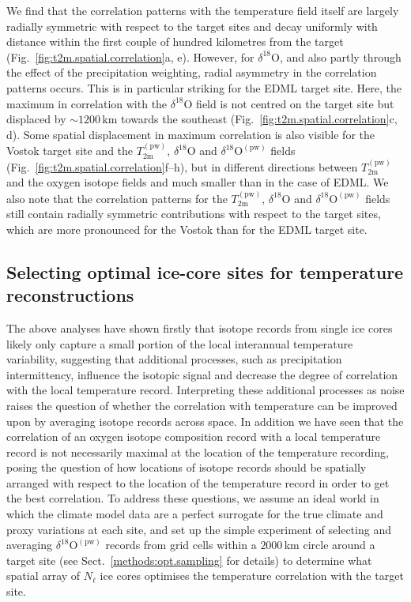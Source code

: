 \documentclass[cp, manuscript]{copernicus}
\begin{document}
We find that the correlation patterns with the temperature field itself are
largely radially symmetric with respect to the target sites and decay uniformly
with distance within the first couple of hundred kilometres from the target
(Fig.~\ref{fig:t2m.spatial.correlation}a, e). However, for
$\delta^{18}\mathrm{O}$, and also partly through the effect of the precipitation
weighting, radial asymmetry in the correlation patterns occurs. This is in
particular striking for the EDML target site. Here, the maximum in correlation
with the $\delta^{18}\mathrm{O}$ field is not centred on the target site but
displaced by $\sim1200$\,km towards the southeast
(Fig.~\ref{fig:t2m.spatial.correlation}c, d). Some spatial displacement in
maximum correlation is also visible for the Vostok target site and the
$T_{2\mathrm{m}}^{\mathrm{(pw)}}$, $\delta^{18}\mathrm{O}$ and
$\delta^{18}\mathrm{O}^{\mathrm{(pw)}}$ fields
(Fig.~\ref{fig:t2m.spatial.correlation}f--h), but in different directions
between $T_{2\mathrm{m}}^{\mathrm{(pw)}}$ and the oxygen isotope fields and much
smaller than in the case of EDML. We also note that the correlation patterns for
the $T_{2\mathrm{m}}^{\mathrm{(pw)}}$, $\delta^{18}\mathrm{O}$ and
$\delta^{18}\mathrm{O}^{\mathrm{(pw)}}$ fields still contain radially symmetric
contributions with respect to the target sites, which are more pronounced for
the Vostok than for the EDML target site.

\subsection{Selecting optimal ice-core sites for temperature reconstructions}
\label{results:picking}

The above analyses have shown firstly that isotope records from single ice cores
likely only capture a small portion of the local interannual temperature
variability, suggesting that additional processes, such as precipitation
intermittency, influence the isotopic signal and decrease the degree of
correlation with the local temperature record. Interpreting these additional
processes as noise raises the question of whether the correlation with
temperature can be improved upon by averaging isotope records across space. In
addition we have seen that the correlation of an oxygen isotope composition
record with a local temperature record is not necessarily maximal at the
location of the temperature recording, posing the question of how locations of
isotope records should be spatially arranged with respect to the location of the
temperature record in order to get the best correlation. To address these
questions, we assume an ideal world in which the climate model data are a
perfect surrogate for the true climate and proxy variations at each site, and
set up the simple experiment of selecting and averaging
$\delta^{18}\mathrm{O}^{\mathrm{(pw)}}$  records from grid cells within a
$2000$\,km circle around a target site (see Sect.~\ref{methods:opt.sampling} for
details) to determine what spatial array of $N_{\ell}$ ice cores optimises the
temperature correlation with the target site.
\end{document}
